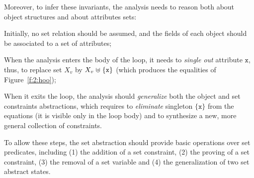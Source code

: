 Moreover, to infer these invariants, the analysis needs to reason
both about object structures and about attributes sets:
\begin{asparaitem}
\item Initially, no set relation should be assumed, and the fields of
  each object should be associated to a set of attributes;
\item When the analysis enters the body of the loop, it needs to
  {\em single out} attribute \( \mathtt{x} \), thus, to replace set
  \( X_v \) by \( X_v \mathrel{\uplus} \{ \mathtt{x} \} \) (which produces the
  equalities of Figure~\ref{f:2:hoo});
\item When it exits the loop, the analysis should {\em generalize}
  both the object and set constraints abstractions, which requires
  to {\em eliminate} singleton \( \{ \mathtt{x} \} \) from the
  equations (it is visible only in the loop body) and to synthesize
  a new, more general collection of constraints.
\end{asparaitem}
To allow these steps, the set abstraction should provide basic operations
over set predicates, including (1) the addition of a set constraint, (2)
the proving of a set constraint, (3) the removal of a set variable and
(4) the generalization of two set abstract states.

